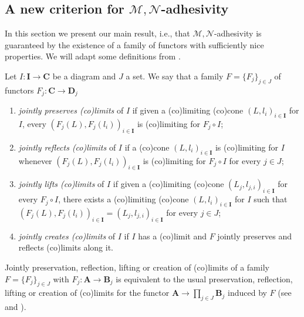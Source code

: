 \documentclass[runningheads,envcountsect]{lmcs}
\newcommand{\catname}[1]{\mathbf{#1}}
\theoremstyle{plain}
\theoremstyle{definition}
\begin{document}
\subsection{A new criterion for $\mathcal{M}, \mathcal{N}$-adhesivity}
In this section we present our main result, i.e., that $\mathcal{M}, \mathcal{N}$-adhesivity is guaranteed by the existence of a family of functors with sufficiently nice properties. We will adapt some definitions from \cite{adamek2004abstract}.%
\begin{defi} 
	Let $I:\catname{I}\rightarrow \catname{C}$ be a diagram and $J$ a set. We say that a family  $F=\{F_j\}_{j\in J}$ of functors $F_j:\catname{C}\rightarrow \catname{D}_j$
	\begin{enumerate}
		\item \emph{jointly preserves (co)limits} of $I$ if given a (co)limiting (co)cone $(L, l_i)_{i\in\catname{I}}$ for $I$,  every $(F_j(L), F_j(l_i))_{i \in \catname{I}}$ is (co)limiting for $F_j\circ I$;
		\item \emph{jointly reflects (co)limits} of $I$ if a (co)cone $(L, l_i)_{i\in\catname{I}}$ is (co)limiting for $I$ whenever $(F_j(L), F_j(l_i))_{i \in \catname{I}}$ is (co)limiting for $F_j\circ I$ for every $j\in J$;
		\item \emph{jointly lifts (co)limits} of $I$ if given a (co)limiting (co)cone $(L_j, l_{j,i})_{i\in\catname{I}}$ for every $F_j\circ I$, there exists a (co)limiting (co)cone $(L, l_i)_{i\in\catname{I}}$ for $I$ such that $(F_j(L), F_j(l_i))_{i \in \catname{I}}= (L_j, l_{j,i})_{i\in\catname{I}}$ for every $j\in J$;
		\item \emph{jointly creates (co)limits} of $I$ if $I$ has a (co)limit and $F$ jointly preserves and reflects (co)limits along it.
	\end{enumerate}
\end{defi}
\begin{rem}
	Jointly preservation, reflection, lifting or creation of (co)limits of a family $F=\{F_j\}_{j\in J}$ with $F_j:\catname{A}\rightarrow \catname{B}_j$ is equivalent to the usual preservation, reflection, lifting or creation of (co)limits for the functor $\catname{A}\rightarrow \prod_{j\in J}\catname{B}_j$ induced by $F$ (see \cite[Def. V.$1$]{mac2013categories} and \cite[Def. $13.17$]{adamek2004abstract}).
\end{rem} 
\end{document}
